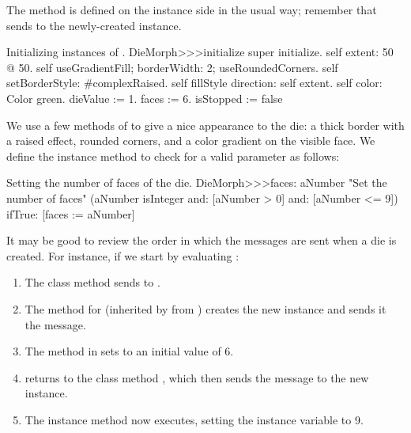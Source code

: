 \documentclass[a4paper,10pt,twoside]{book}
\begin{document}
The  method is defined on the instance side in the usual way; remember that  sends  to the newly-created instance.
\begin{method}{Initializing instances of .}
DieMorph>>>initialize
	super initialize.
	self extent: 50 @ 50.
	self useGradientFill; borderWidth: 2; useRoundedCorners.
	self setBorderStyle: #complexRaised.
	self fillStyle direction: self extent.
	self color: Color green.
	dieValue := 1.
	faces := 6.
	isStopped := false
\end{method}

We use a few methods of  to give a nice appearance to the die: a thick border with a raised effect, rounded corners, and a color gradient on the visible face.
We define the instance method  to check for a valid parameter as follows:
\begin{method}{Setting the number of faces of the die.}
DieMorph>>>faces: aNumber
	"Set the number of faces"
	(aNumber isInteger
			and: [aNumber > 0]
			and: [aNumber <= 9])
		ifTrue: [faces := aNumber]
\end{method}

It may be good to review the order in which the messages are sent when a die is created. For instance, if we start by
evaluating :
\begin{enumerate}
	\item The class method  sends  to .
	\item The method for  (inherited by  from ) creates the new instance and sends it the  message.
	\item The  method in  sets  to an initial value of 6.
	\item {} returns to the class method , which then sends the message  to the new instance.
	\item The instance method  now executes, setting the  instance variable to 9.
\end{enumerate}
\end{document}
